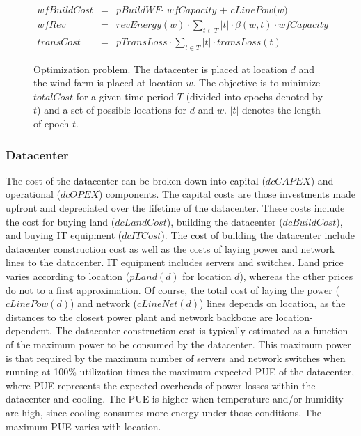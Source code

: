 \begin{figure}
\begin{scriptsize}
\begin{eqnarray}
  \textit{wfBuildCost}&=& \textit{pBuildWF} \cdot \textit{ wfCapacity + cLinePow(w)} \\
  \textit{wfRev}&=& \textit{revEnergy}(w) \cdot  \sum_{t \in T}{ |t| \cdot
                    \beta(w,t) \cdot  \textit{wfCapacity} } \\
  \textit{transCost}&=& \textit{pTransLoss} \cdot \sum_{t \in T}{ |t| \cdot  \textit{transLoss}(t)} %
\end{eqnarray}
\end{scriptsize}
\caption{Optimization problem.  The datacenter is placed at location
  $d$ and the wind farm is placed at location $w$.  The objective is to minimize $totalCost$ for a given time period $T$ (divided into epochs denoted by $t$) and a set of possible locations for $d$ and $w$.  $|t|$ denotes the length of epoch $t$.}
\label{fig:optimization}
\vspace{-0.2in}
\end{figure}




\subsubsection{Datacenter} The cost of the datacenter can be broken down into capital ($dcCAPEX$) and operational ($dcOPEX$) components.  The capital costs are those investments made upfront and depreciated over the lifetime of the datacenter.  These costs include the cost for buying land ($dcLandCost$), building the datacenter ($dcBuildCost$), and buying IT equipment ($dcITCost$).  The cost of building the datacenter include datacenter construction cost as well as the costs of laying power and network lines to the datacenter.  IT equipment includes servers and switches.  Land price varies according to location ($pLand(d)$ for location $d$), whereas the other prices do not to a first approximation.  Of course, the total cost of laying the power ($cLinePow(d)$) and network ($cLineNet(d)$) lines depends on location, as the distances to the closest power plant and network backbone are location-dependent.  The datacenter construction cost is typically estimated as a function of the maximum power to be consumed by the datacenter.  This maximum power is that required by the maximum number of servers and network switches when running at 100\% utilization times the maximum expected PUE of the datacenter, where PUE represents the expected overheads of power losses within the datacenter and cooling.
The PUE is higher when temperature and/or humidity are high, since cooling consumes more energy under those conditions.  The maximum PUE varies with location.

